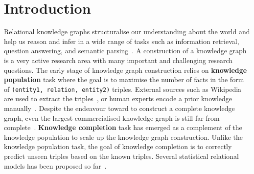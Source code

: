 
\section{Introduction}
\label{sec:intro}

Relational knowledge graphs structuralise our understanding about the world
and help us reason and infer in a wide range of tasks such as information retrieval, question answering, and semantic parsing~\cite{Dong2015,jiang2015improving,kim2013context}.
A construction of a knowledge graph is a very active research area with many important and challenging research questions.
The early stage of knowledge graph construction relies on {\bf knowledge population} task
where the goal is to maximise the number of facts in the form of \texttt{(entity1, relation, entity2)} triples.
External sources such as Wikipedia are used to extract the triples~\cite{hoffart2013yago2},
or human experts encode a prior knowledge manually~\cite{bollacker2008freebase}.
Despite the endeavour toward to construct a complete knowledge graph, 
even the largest commercialised knowledge graph is still far from complete~\cite{dong2014knowledge}. 
{\bf Knowledge completion} task has emerged as a complement of the knowledge population 
to scale up the knowledge graph construction. 
Unlike the knowledge population task, the goal of knowledge completion is to correctly predict unseen triples based on the known triples. 
Several statistical relational models has been proposed so far~\cite{Lao2010,nickel2011three}.

